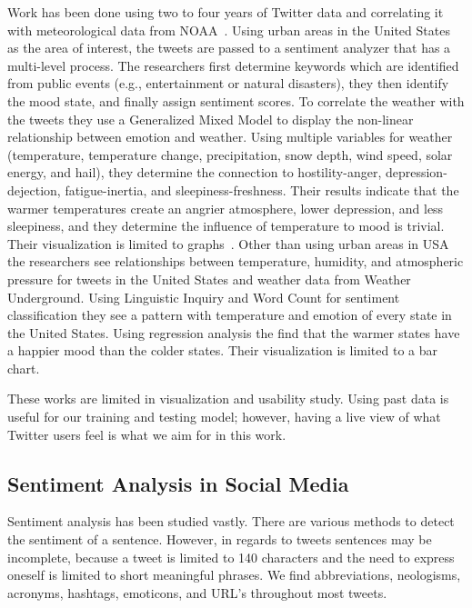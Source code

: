 Work has been done using two to four years of Twitter data and correlating it with meteorological data from NOAA~\cite{hannak2012tweetin,keller2005warm}. Using urban areas in the United States as the area of interest, the tweets are passed to a sentiment analyzer that has a multi-level process. The researchers first determine keywords which are identified from public events (e.g., entertainment or natural disasters), they then identify the mood state, and finally assign sentiment scores. To correlate the weather with the tweets they use a Generalized Mixed Model to display the non-linear relationship between emotion and weather. Using multiple variables for weather (temperature, temperature change, precipitation, snow depth, wind speed, solar energy, and hail), they determine the connection to hostility-anger, depression-dejection, fatigue-inertia, and sleepiness-freshness. Their results indicate that the warmer temperatures create an angrier atmosphere, lower depression, and less sleepiness, and they determine the influence of temperature to mood is trivial. Their visualization is limited to graphs~\cite{hannak2012tweetin}. Other than using urban areas in USA the researchers see relationships between temperature, humidity, and atmospheric pressure for tweets in the United States and weather data from Weather Underground. Using Linguistic Inquiry and Word Count for sentiment classification they see a pattern with temperature and emotion of every state in the United States. Using regression analysis the find that the warmer states have a happier mood than the colder states. Their visualization is limited to a bar chart.

These works are limited in visualization and usability study. Using past data is useful for our training and testing model; however, having a live view of what Twitter users feel is what we aim for in this work.


\subsection{Sentiment Analysis in Social Media}

Sentiment analysis has been studied vastly. There are various methods to detect the sentiment of a sentence. However, in regards to tweets sentences may be incomplete, because a tweet is limited to 140 characters and the need to express oneself is limited to short meaningful phrases. We find abbreviations, neologisms, acronyms, hashtags, emoticons, and URL's throughout most tweets.

